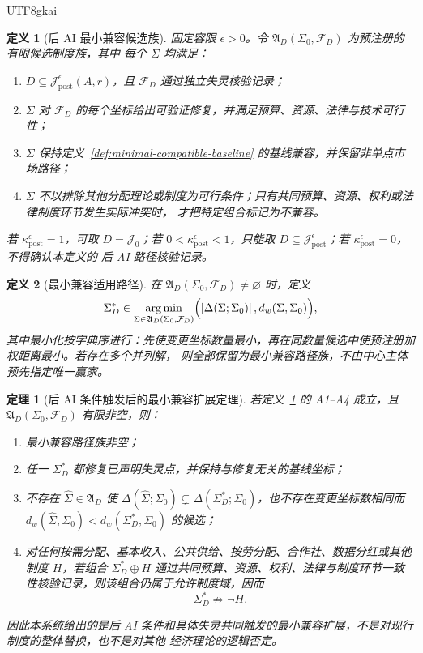 \documentclass[12pt,a4paper,openany]{report}
\newtheorem{definition}{定义}[chapter]
\newtheorem{theorem}{定理}[chapter]
\newcommand{\Goods}{\mathcal J}
\newcommand{\Abs}[1]{\left\lvert #1\right\rvert}
\DeclareMathOperator*{\argmin}{arg\,min}
\begin{document}
\begin{CJK*}{UTF8}{gkai}
\begin{definition}[后 AI 最小兼容候选族]
\label{def:minimal-compatible-family}
固定容限 \(\epsilon>0\)。令 \(\mathfrak A_D(\Sigma_0,\mathcal F_D)\) 为预注册的有限候选制度族，其中
每个 \(\Sigma\) 均满足：
\begin{enumerate}[label=\textnormal{A\arabic*:},leftmargin=3.5em]
  \item \(D\subseteq\Goods_{\mathrm{post}}^\epsilon(A,r)\)，且 \(\mathcal F_D\) 通过独立失灵核验记录；
  \item \(\Sigma\) 对 \(\mathcal F_D\) 的每个坐标给出可验证修复，并满足预算、资源、法律与技术可行性；
  \item \(\Sigma\) 保持定义~\ref{def:minimal-compatible-baseline} 的基线兼容，并保留非单点市场路径；
  \item \(\Sigma\) 不以排除其他分配理论或制度为可行条件；只有共同预算、资源、权利或法律制度环节发生实际冲突时，
  才把特定组合标记为不兼容。
\end{enumerate}
若 \(\kappa_{\mathrm{post}}^\epsilon=1\)，可取 \(D=\Goods_0\)；若
\(0<\kappa_{\mathrm{post}}^\epsilon<1\)，只能取
\(D\subseteq\Goods_{\mathrm{post}}^\epsilon\)；若 \(\kappa_{\mathrm{post}}^\epsilon=0\)，不得确认本定义的
后 AI 路径核验记录。
\end{definition}

\begin{definition}[最小兼容适用路径]
\label{def:minimal-compatible-path}
在 \(\mathfrak A_D(\Sigma_0,\mathcal F_D)\ne\varnothing\) 时，定义
\[
  \Sigma_D^*
  \in
  \argmin_{\Sigma\in\mathfrak A_D(\Sigma_0,\mathcal F_D)}
  \Bigl(
  \Abs{\Delta(\Sigma;\Sigma_0)},
  d_w(\Sigma,\Sigma_0)
  \Bigr),
\]
其中最小化按字典序进行：先使变更坐标数量最小，再在同数量候选中使预注册加权距离最小。若存在多个并列解，
则全部保留为最小兼容路径族，不由中心主体预先指定唯一赢家。
\end{definition}

\begin{theorem}[后 AI 条件触发后的最小兼容扩展定理]
\label{thm:minimal-compatible-extension}
若定义~\ref{def:minimal-compatible-family} 的 A1--A4 成立，且
\(\mathfrak A_D(\Sigma_0,\mathcal F_D)\) 有限非空，则：
\begin{enumerate}[label=\textup{(M\arabic*)},leftmargin=4em]
  \item 最小兼容路径族非空；
  \item 任一 \(\Sigma_D^*\) 都修复已声明失灵点，并保持与修复无关的基线坐标；
  \item 不存在 \(\widehat\Sigma\in\mathfrak A_D\) 使
  \(\Delta(\widehat\Sigma;\Sigma_0)\subsetneq\Delta(\Sigma_D^*;\Sigma_0)\)，也不存在变更坐标数相同而
  \(d_w(\widehat\Sigma,\Sigma_0)<d_w(\Sigma_D^*,\Sigma_0)\) 的候选；
  \item 对任何按需分配、基本收入、公共供给、按劳分配、合作社、数据分红或其他制度 \(H\)，若组合
  \(\Sigma_D^*\oplus H\) 通过共同预算、资源、权利、法律与制度环节一致性核验记录，则该组合仍属于允许制度域，因而
  \[
    \Sigma_D^*\not\Longrightarrow\neg H.
  \]
\end{enumerate}
因此本系统给出的是后 AI 条件和具体失灵共同触发的最小兼容扩展，不是对现行制度的整体替换，也不是对其他
经济理论的逻辑否定。
\end{theorem}


\end{CJK*}
\end{document}
